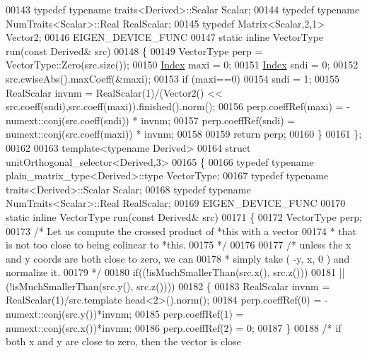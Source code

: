 \begin{DoxyCode}
00143   \textcolor{keyword}{typedef} \textcolor{keyword}{typename} traits<Derived>::Scalar Scalar;
00144   \textcolor{keyword}{typedef} \textcolor{keyword}{typename} NumTraits<Scalar>::Real RealScalar;
00145   \textcolor{keyword}{typedef} Matrix<Scalar,2,1> Vector2;
00146   EIGEN\_DEVICE\_FUNC
00147   \textcolor{keyword}{static} \textcolor{keyword}{inline} VectorType run(\textcolor{keyword}{const} Derived& src)
00148   \{
00149     VectorType perp = VectorType::Zero(src.size());
00150     \hyperlink{namespace_eigen_a62e77e0933482dafde8fe197d9a2cfde}{Index} maxi = 0;
00151     \hyperlink{namespace_eigen_a62e77e0933482dafde8fe197d9a2cfde}{Index} sndi = 0;
00152     src.cwiseAbs().maxCoeff(&maxi);
00153     \textcolor{keywordflow}{if} (maxi==0)
00154       sndi = 1;
00155     RealScalar invnm = RealScalar(1)/(Vector2() << src.coeff(sndi),src.coeff(maxi)).finished().norm();
00156     perp.coeffRef(maxi) = -numext::conj(src.coeff(sndi)) * invnm;
00157     perp.coeffRef(sndi) =  numext::conj(src.coeff(maxi)) * invnm;
00158 
00159     \textcolor{keywordflow}{return} perp;
00160    \}
00161 \};
00162 
00163 \textcolor{keyword}{template}<\textcolor{keyword}{typename} Derived>
00164 \textcolor{keyword}{struct }unitOrthogonal\_selector<Derived,3>
00165 \{
00166   \textcolor{keyword}{typedef} \textcolor{keyword}{typename} plain\_matrix\_type<Derived>::type VectorType;
00167   \textcolor{keyword}{typedef} \textcolor{keyword}{typename} traits<Derived>::Scalar Scalar;
00168   \textcolor{keyword}{typedef} \textcolor{keyword}{typename} NumTraits<Scalar>::Real RealScalar;
00169   EIGEN\_DEVICE\_FUNC
00170   \textcolor{keyword}{static} \textcolor{keyword}{inline} VectorType run(\textcolor{keyword}{const} Derived& src)
00171   \{
00172     VectorType perp;
00173     \textcolor{comment}{/* Let us compute the crossed product of *this with a vector}
00174 \textcolor{comment}{     * that is not too close to being colinear to *this.}
00175 \textcolor{comment}{     */}
00176 
00177     \textcolor{comment}{/* unless the x and y coords are both close to zero, we can}
00178 \textcolor{comment}{     * simply take ( -y, x, 0 ) and normalize it.}
00179 \textcolor{comment}{     */}
00180     \textcolor{keywordflow}{if}((!isMuchSmallerThan(src.x(), src.z()))
00181     || (!isMuchSmallerThan(src.y(), src.z())))
00182     \{
00183       RealScalar invnm = RealScalar(1)/src.template head<2>().norm();
00184       perp.coeffRef(0) = -numext::conj(src.y())*invnm;
00185       perp.coeffRef(1) = numext::conj(src.x())*invnm;
00186       perp.coeffRef(2) = 0;
00187     \}
00188     \textcolor{comment}{/* if both x and y are close to zero, then the vector is close}

\end{DoxyCode}
